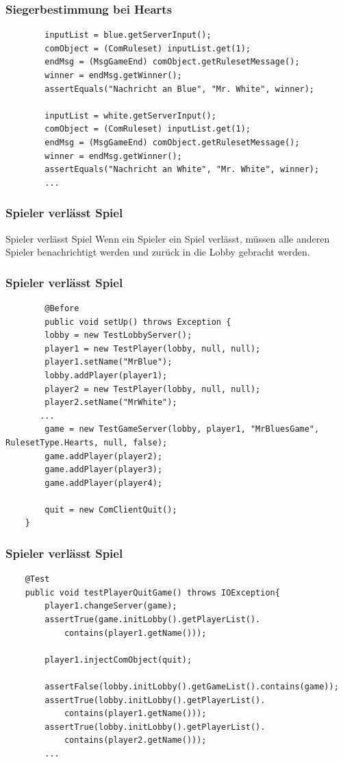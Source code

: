 \documentclass{beamer}
\begin{document}
\begin{frame}[fragile]
\frametitle{Siegerbestimmung bei Hearts}
\begin{lstlisting}
		inputList = blue.getServerInput();
		comObject = (ComRuleset) inputList.get(1);
		endMsg = (MsgGameEnd) comObject.getRulesetMessage();
		winner = endMsg.getWinner();
		assertEquals("Nachricht an Blue", "Mr. White", winner);

		inputList = white.getServerInput();
		comObject = (ComRuleset) inputList.get(1);
		endMsg = (MsgGameEnd) comObject.getRulesetMessage();
		winner = endMsg.getWinner();
		assertEquals("Nachricht an White", "Mr. White", winner);
		...
\end{lstlisting}
\end{frame}

\begin{frame}
\frametitle{Spieler verlässt Spiel}
	\begin{block}
		{Spieler verlässt Spiel} Wenn ein Spieler ein Spiel verlässt, müssen alle anderen Spieler benachrichtigt werden und zurück in die Lobby gebracht werden.
	\end{block}
\end{frame}

\begin{frame}[fragile]
\frametitle{Spieler verlässt Spiel}
\begin{lstlisting}
		@Before
		public void setUp() throws Exception {
		lobby = new TestLobbyServer();
		player1 = new TestPlayer(lobby, null, null);
		player1.setName("MrBlue");
		lobby.addPlayer(player1);		
		player2 = new TestPlayer(lobby, null, null);
		player2.setName("MrWhite");
	   ...	
		game = new TestGameServer(lobby, player1, "MrBluesGame", RulesetType.Hearts, null, false);	
		game.addPlayer(player2);
		game.addPlayer(player3);
		game.addPlayer(player4);
		
		quit = new ComClientQuit();
	}
\end{lstlisting}
\end{frame}


\begin{frame}[fragile]
\frametitle{Spieler verlässt Spiel}
\begin{lstlisting}
	@Test
	public void testPlayerQuitGame() throws IOException{ 	
		player1.changeServer(game);
		assertTrue(game.initLobby().getPlayerList().
		    contains(player1.getName()));
		
		player1.injectComObject(quit);

		assertFalse(lobby.initLobby().getGameList().contains(game));
		assertTrue(lobby.initLobby().getPlayerList().
		    contains(player1.getName()));
		assertTrue(lobby.initLobby().getPlayerList().
		    contains(player2.getName()));
		...
\end{lstlisting}
\end{frame}
\end{document}

